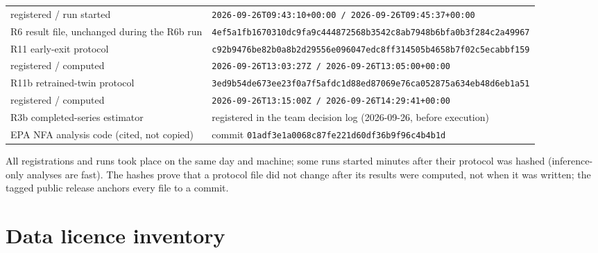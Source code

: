 \documentclass[11pt,a4paper]{article}
\begin{document}
\begin{table}[!ht]
\begin{tabularx}{\linewidth}{@{}Lp{9.6cm}@{}}
\quad registered / run started & \texttt{\scriptsize 2026-09-26T09:43:10+00:00 / 2026-09-26T09:45:37+00:00} \\
\quad R6 result file, unchanged during the R6b run & \texttt{\scriptsize 4ef5a1fb1670310dc9fa9c444872568b3542c8ab7948b6bfa0b3f284c2a49967} \\
R11 early-exit protocol & \texttt{\scriptsize c92b9476be82b0a8b2d29556e096047edc8ff314505b4658b7f02c5ecabbf159} \\
\quad registered / computed & \texttt{\scriptsize 2026-09-26T13:03:27Z / 2026-09-26T13:05:00+00:00} \\
R11b retrained-twin protocol & \texttt{\scriptsize 3ed9b54de673ee23f0a7f5afdc1d88ed87069e76ca052875a634eb48d6eb1a51} \\
\quad registered / computed & \texttt{\scriptsize 2026-09-26T13:15:00Z / 2026-09-26T14:29:41+00:00} \\
R3b completed-series estimator & registered in the team decision log (2026-09-26, before execution) \\
EPA NFA analysis code (cited, not copied) & commit \texttt{\scriptsize 01adf3e1a0068c87fe221d60df36b9f96c4b4b1d} \\
\bottomrule
\end{tabularx}
\end{table}

All registrations and runs took place on the same day and machine; some runs started minutes after their
protocol was hashed (inference-only analyses are fast). The hashes prove that a protocol file did not change after
its results were computed, not when it was written; the tagged public release anchors every file to a commit.
\FloatBarrier

\section{Data licence inventory}\label{app:licences}
\end{document}
